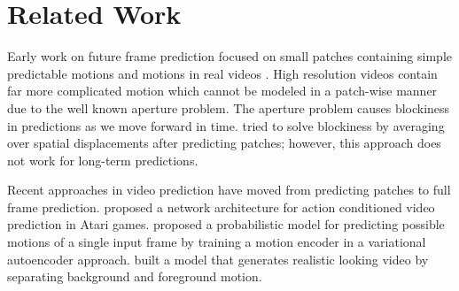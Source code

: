 \documentclass{article}
\newcommand{\cutsectionup}{\vspace*{-0.1in}}
\newcommand{\cutsectiondown}{\vspace*{-0.05in}}
\newcommand{\cutsectionup}{}
\newcommand{\cutsectiondown}{}
\begin{document}
\cutsectionup\section{Related Work}\label{sec:relatedwork}\cutsectiondown%
Early work on future frame prediction focused on small patches containing simple predictable motions \cite{NIPS2008_3567, michalski_grammar_cells,icml2014c2_mittelman14} and motions in real videos \cite{Ranzato14, Srivastava15}.
High resolution videos contain far more complicated motion which cannot be modeled in a patch-wise manner due to the well known aperture problem.
The aperture problem causes blockiness in predictions as we move forward in time.
\citet{Ranzato14} tried to solve blockiness by averaging over spatial displacements after predicting patches; however, this approach does not work for long-term predictions.

Recent approaches in video prediction have moved from predicting patches to full frame prediction.
\citet{Oh15} proposed a network architecture for action conditioned video prediction in Atari games.
\citet{visualdynamics16} proposed a probabilistic model for predicting possible motions of a single input frame by training a motion encoder in a variational autoencoder approach.
\citet{Vondrick16} built a model that generates realistic looking video by separating background and foreground motion.
\end{document}
